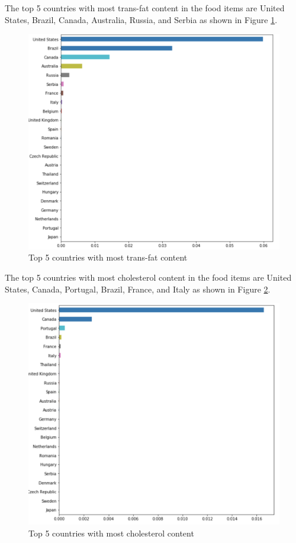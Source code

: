 \documentclass[sigconf]{acmart}
\begin{document}
    
The top 5 countries with most trans-fat content in the food items are United States, Brazil, Canada, Australia, Russia, and Serbia as shown in Figure \ref{fig:Fig10}. \\
	
\begin{figure}
\includegraphics[width=1.0\columnwidth]{images/fig10.png}
\caption{Top 5 countries with most trans-fat content \cite{code-base}}
\label{fig:Fig10}
\end{figure}
        
The top 5 countries with most cholesterol content in the food items are United States, Canada, Portugal, Brazil, France, and Italy as shown in Figure \ref{fig:Fig11}. \\
	
\begin{figure}
\includegraphics[width=1.0\columnwidth]{images/fig11.png}
\caption{Top 5 countries with most cholesterol content \cite{code-base}}
\label{fig:Fig11}
\end{figure}
\end{document}
